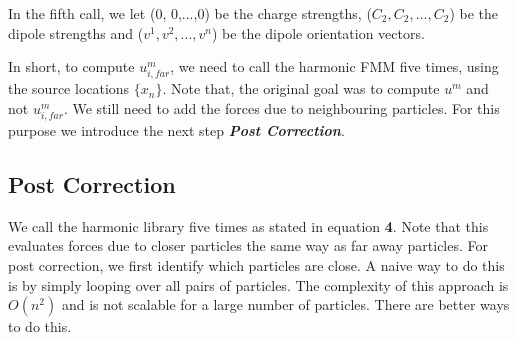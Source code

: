 \documentclass[a4paper,9pt]{report}
\begin{document}
 \vskip 0.5cm

 In the fifth call, we let (0, 0,...,0) be the charge strengths, ($C_{2},C_{2},...,C_{2}$) be the dipole strengths and ($v^{1}, v^{2},...,v^{n}$) be the dipole orientation vectors.   

\vskip 0.5cm
In short, to compute $u^{m}_{i,far}$, we need to call the harmonic FMM five times, using the source locations $\{x_{n}\}$. Note that, the original goal was to compute $u^{m}$ and not $u^{m}_{i,far}$. We still need to add the forces due to neighbouring particles. For this purpose we introduce the next step \textbf{\textit{Post Correction}}.



\subsection*{Post Correction}
  
  We call the harmonic library five times as stated in equation \textbf{4}. Note that this evaluates forces due to closer particles the same way as far away particles. For post correction, we first identify which particles are close. A naive way to do this is by simply looping over all pairs of particles. The complexity of this approach is $O(n^{2})$ and is not scalable for a large number of particles. There are better ways to do this.  







     
\end{document}
